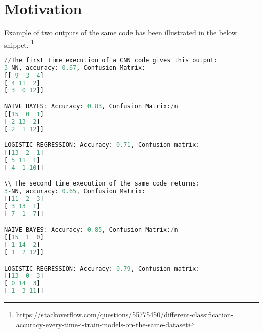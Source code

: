 \section{Motivation}
\label{sec:motivation}
Example of two outputs of the same code has been illustrated in the below snippet. \footnote{https://stackoverflow.com/questions/55775450/different-classification-accuracy-every-time-i-train-models-on-the-same-dataset}
\small
\begin{lstlisting}[language=Python, caption=Motivating example of model verification to interpret accuracy for accountable ML]
//The first time execution of a CNN code gives this output:
3-NN, accuracy: 0.67, Confusion Matrix:
[[ 9  3  4]
[ 4 11  2]
[ 3  0 12]]

NAIVE BAYES: Accuracy: 0.83, Confusion Matrix:/n
[[15  0  1]
[ 2 13  2]
[ 2  1 12]]

LOGISTIC REGRESSION: Accuracy: 0.71, Confusion matrix:
[[13  2  1]
[ 5 11  1]
[ 4  1 10]]

\\ The second time execution of the same code returns:
3-NN, accuracy: 0.65, Confusion Matrix:
[[11  2  3]
[ 3 13  1]
[ 7  1  7]]

NAIVE BAYES: Accuracy: 0.85, Confusion Matrix:/n
[[15  1  0]
[ 1 14  2]
[ 1  2 12]]

LOGISTIC REGRESSION: Accuracy: 0.79, Confusion matrix:
[[13  0  3]
[ 0 14  3]
[ 1  3 11]]
\end{lstlisting}
